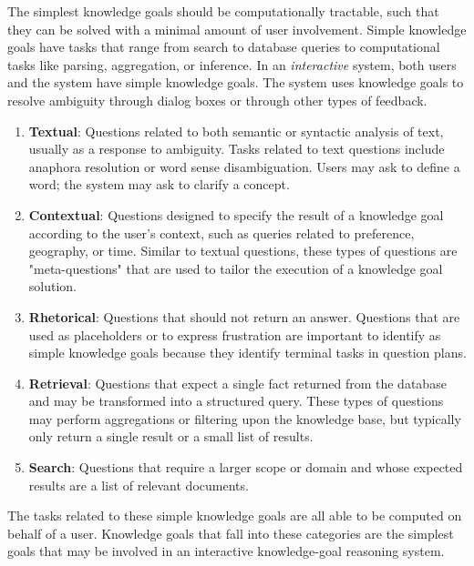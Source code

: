 \documentclass[11pt,letterpaper]{article}
\begin{document}
The simplest knowledge goals should be computationally tractable, such that they can be solved with a minimal amount of user involvement. Simple knowledge goals have tasks that range from search to database queries to computational tasks like parsing, aggregation, or inference. In an \textit{interactive} system, both users and the system have simple knowledge goals. The system uses knowledge goals to resolve ambiguity through dialog boxes or through other types of feedback.

\begin{enumerate}

\item \textbf{Textual}: Questions related to both semantic or syntactic analysis of text, usually as a response to ambiguity. Tasks related to text questions include anaphora resolution or word sense disambiguation. Users may ask to define a word; the system may ask to clarify a concept.

\item \textbf{Contextual}: Questions designed to specify the result of a knowledge goal according to the user's context, such as queries related to preference, geography, or time. Similar to textual questions, these types of questions are "meta-questions" that are used to tailor the execution of a knowledge goal solution.

\item \textbf{Rhetorical}: Questions that should not return an answer. Questions that are used as placeholders or to express frustration are important to identify as simple knowledge goals because they identify terminal tasks in question plans.

\item \textbf{Retrieval}: Questions that expect a single fact returned from the database and may be transformed into a structured query. These types of questions may perform aggregations or filtering upon the knowledge base, but typically only return a single result or a small list of results.

\item \textbf{Search}: Questions that require a larger scope or domain and whose expected results are a list of relevant documents.

\end{enumerate}

The tasks related to these simple knowledge goals are all able to be computed on behalf of a user. Knowledge goals that fall into these categories are the simplest goals that may be involved in an interactive knowledge-goal reasoning system.
\end{document}

